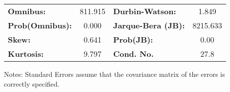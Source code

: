 \begin{center}
\begin{tabular}{lcccccc}
\bottomrule
\end{tabular}
\begin{tabular}{lclc}
\textbf{Omnibus:}       & 811.915 & \textbf{  Durbin-Watson:     } &    1.849  \\
\textbf{Prob(Omnibus):} &   0.000 & \textbf{  Jarque-Bera (JB):  } & 8215.633  \\
\textbf{Skew:}          &   0.641 & \textbf{  Prob(JB):          } &     0.00  \\
\textbf{Kurtosis:}      &   9.797 & \textbf{  Cond. No.          } &     27.8  \\
\bottomrule
\end{tabular}
\end{center}

Notes: \newline
 [1] Standard Errors assume that the covariance matrix of the errors is correctly specified.